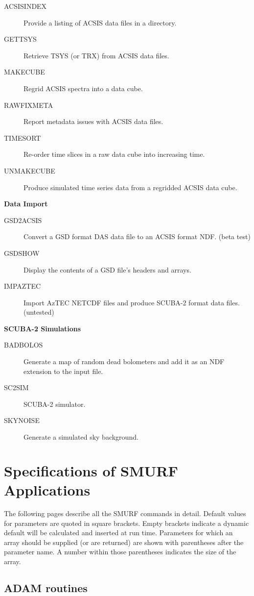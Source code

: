 \documentclass[twoside,11pt]{article}
\newcommand{\htmlref}[2]{#1}
\newcommand{\xlabel}[1]{}
\renewcommand{\_}{\texttt{\symbol{95}}}
\newcommand{\classitem}[1]{\item [\htmlref{#1}{#1}]}
\begin{document}
\begin{small}
\begin{description}
\classitem{ACSIS\_INDEX}
  Provide a listing of ACSIS data files in a directory.
\classitem{GETTSYS}
Retrieve TSYS (or TRX) from ACSIS data files.
\classitem{MAKECUBE}
 Regrid ACSIS spectra into a data cube.
\classitem{RAWFIXMETA}
 Report metadata issues with ACSIS data files.
\classitem{TIMESORT}
 Re-order time slices in a raw data cube into increasing time.
\classitem{UNMAKECUBE}
 Produce simulated time series data from a regridded ACSIS data cube.
\end{description}

{\large
\begin{center}
{\bf Data Import}
\end{center}
}

\begin{description}
\classitem{GSD2ACSIS}
 Convert a GSD format DAS data file to an ACSIS format NDF. (beta test)
\classitem{GSDSHOW}
 Display the contents of a GSD file's headers and arrays.
\classitem{IMPAZTEC}
 Import AzTEC NETCDF files and produce SCUBA-2 format data files. (untested)
\end{description}

{\large
\begin{center}
{\bf SCUBA-2 Simulations}
\end{center}
}

\begin{description}
\classitem{BADBOLOS}
 Generate a map of random dead bolometers and add it as an NDF extension to the input file.
\classitem{SC2SIM}
SCUBA-2 simulator.
\classitem{SKYNOISE}
 Generate a simulated sky background.
\end{description}

\end{small}

\section{\xlabel{ap_full}Specifications of SMURF Applications\label{ap:full}}

The following pages describe all the SMURF commands in detail. Default
values for parameters are quoted in square brackets. Empty brackets
indicate a dynamic default will be calculated and inserted at run
time. Parameters for which an array should be supplied (or are
returned) are shown with parentheses after the parameter name. A
number within those parentheses indicates the size of the array.

\subsection{ADAM routines}
\end{document}

